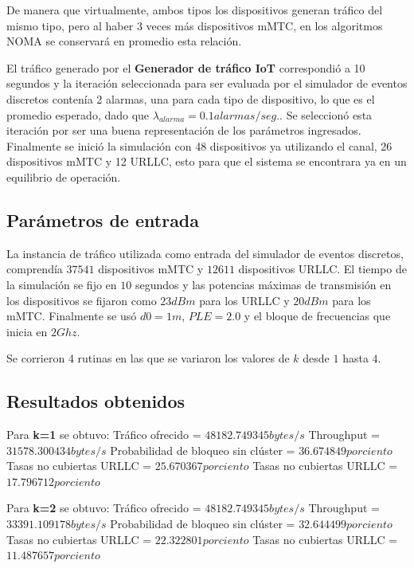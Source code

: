 De manera que virtualmente, ambos tipos los dispositivos generan tráfico del mismo tipo, pero al haber 3 veces más dispositivos mMTC, en los algoritmos NOMA se conservará en promedio esta relación.

El tráfico generado por el \textbf{Generador de tráfico IoT} correspondió a 10 segundos y la iteración seleccionada para ser evaluada por el simulador de eventos discretos contenía 2 alarmas, una para cada tipo de dispositivo, lo que es el promedio esperado, dado que $\lambda_{alarma} = 0.1 alarmas/seg.$. Se seleccionó esta iteración por ser una buena representación de los parámetros ingresados. Finalmente se inició la simulación con 48 dispositivos ya utilizando el canal, 26 dispositivos mMTC y 12 URLLC, esto para que el sistema se encontrara ya en un equilibrio de operación.

\subsection{Parámetros de entrada}

La instancia de tráfico utilizada como entrada del simulador de eventos discretos, comprendía $37541$ dispositivos mMTC y $12611$ dispositivos URLLC. El tiempo de la simulación se fijo en $10$ segundos y las potencias máximas de transmisión en los dispositivos se fijaron como $23dBm$ para los URLLC y $20dBm$ para los mMTC. Finalmente se usó $d0=1m$, $PLE=2.0$ y el bloque de frecuencias que inicia en $2Ghz$. 

Se corrieron 4 rutinas en las que se variaron los valores de $k$ desde $1$ hasta $4$.

\subsection{Resultados obtenidos}
Para \textbf{k=1} se obtuvo:\newline
Tráfico ofrecido = $48182.749345 bytes/s$ \newline
Throughput = $31578.300434 bytes/s$ \newline
Probabilidad de bloqueo sin clúster = $36.674849 porciento$ \newline
Tasas no cubiertas URLLC = $25.670367 porciento$ \newline
Tasas no cubiertas URLLC = $17.796712 porciento$ \newline

Para \textbf{k=2} se obtuvo:\newline
Tráfico ofrecido = $48182.749345 bytes/s$ \newline
Throughput = $33391.109178 bytes/s$ \newline
Probabilidad de bloqueo sin clúster = $32.644499 porciento$ \newline
Tasas no cubiertas URLLC = $22.322801 porciento$ \newline
Tasas no cubiertas URLLC = $11.487657 porciento$ \newline

